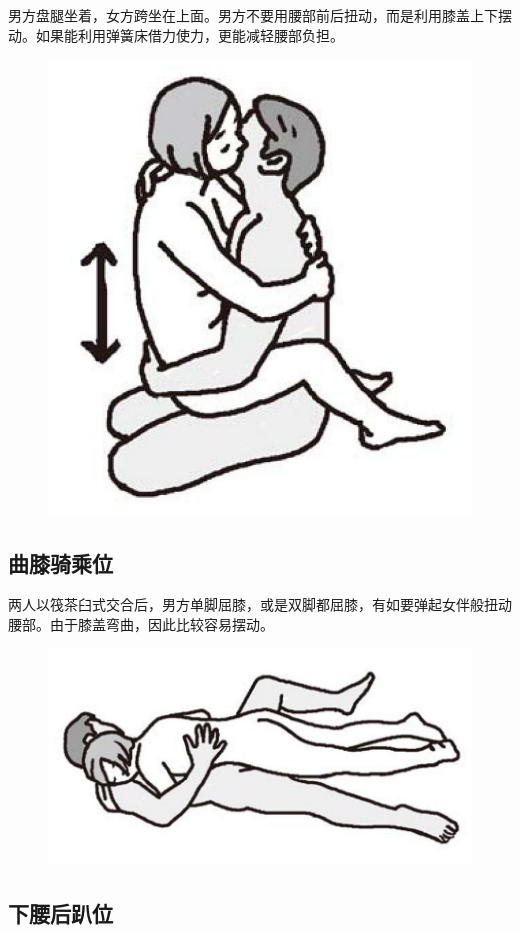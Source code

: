 \documentclass[12pt,UTF8]{ctexbook}
\begin{document}
男方盘腿坐着，女方跨坐在上面。男方不要用腰部前后扭动，而是利用膝盖上下摆动。如果能利用弹簧床借力使力，更能减轻腰部负担。

\begin{figure}[htbp]
	\centering
	\includegraphics[width=0.7\linewidth]{tw9}
	\caption{}
	\label{fig:1}
\end{figure}

\subsection{曲膝骑乘位}

两人以筏茶臼式交合后，男方单脚屈膝，或是双脚都屈膝，有如要弹起女伴般扭动腰部。由于膝盖弯曲，因此比较容易摆动。

\begin{figure}[htbp]
	\centering
	\includegraphics[width=0.7\linewidth]{tw10}
	\caption{}
	\label{fig:1}
\end{figure}

\subsection{下腰后趴位}
\end{document}
